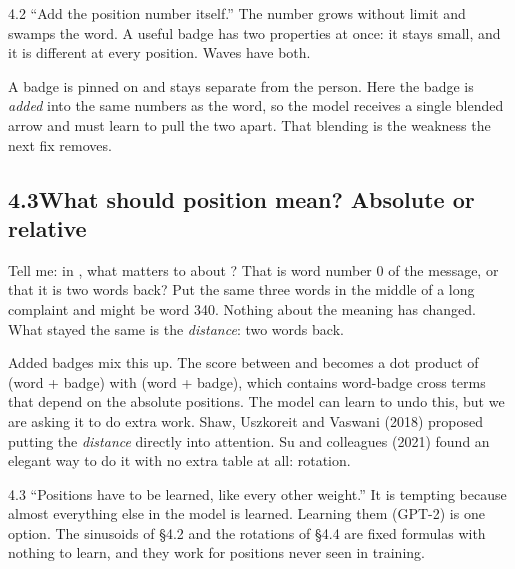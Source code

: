 \begin{wrongidea}{4.2}
``Add the position number itself.'' The number grows without limit and swamps the word. A useful badge
has two properties at once: it stays small, and it is different at every position. Waves have both.
\end{wrongidea}

\begin{breaks}
A badge is pinned on and stays separate from the person. Here the badge is \emph{added} into the same
numbers as the word, so the model receives a single blended arrow and must learn to pull the two apart.
That blending is the weakness the next fix removes.
\end{breaks}


\subsection*{4.3\quad What should position mean? Absolute or relative}

Tell me: in , what matters to  about ? That  is word
number 0 of the message, or that it is two words back? Put the same three words in the middle of a long
complaint and  might be word 340. Nothing about the meaning has changed. What stayed the same
is the \emph{distance}: two words back.

Added badges mix this up. The score between  and  becomes a dot product of
(word + badge) with (word + badge), which contains word-badge cross terms that depend on the absolute
positions. The model can learn to undo this, but we are asking it to do extra work. Shaw, Uszkoreit and
Vaswani (2018) proposed putting the \emph{distance} directly into attention. Su and colleagues (2021)
found an elegant way to do it with no extra table at all: rotation.

\begin{wrongidea}{4.3}
``Positions have to be learned, like every other weight.'' It is tempting because almost everything else in
the model is learned. Learning them (GPT-2) is one option. The sinusoids of \S4.2 and the rotations of \S4.4
are fixed formulas with nothing to learn, and they work for positions never seen in training.
\end{wrongidea}

